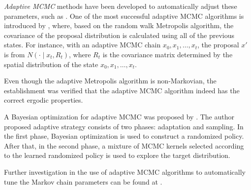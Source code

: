 
\textit{Adaptive MCMC} methods have been developed to automatically adjust these parameters, such as \citep{andrieu2008tutorial, girolami2011riemann,  atchade2009adaptive, roberts2009examples}. One of the most successful adaptive MCMC algorithms is introduced by \cite{haario2001adaptive}, where, based on the  random walk Metropolis algorithm, the covariance of the proposal distribution is calculated using all of the previous states. For instance, with an adaptive MCMC chain $x_0,x_1,\ldots,x_t$, the proposal $x'$ is from $N(\cdot\mid x_t,R_t)$, where $R_t$ is the covariance matrix determined by the spatial distribution of the state $x_0,x_1,\ldots,x_t$. 

Even though the adaptive Metropolis algorithm is non-Markovian, the establishment was verified that the adaptive MCMC algorithm indeed has the correct ergodic properties. 

A Bayesian optimization for adaptive MCMC was proposed by \cite{mahendran2012adaptive}. The author proposed adaptive strategy consists of two phases: adaptation and sampling. In the first phase, Bayesian optimization is used to construct a randomized policy. After that, in the second phase,  a mixture of MCMC kernels selected according to the learned randomized policy is used to explore the target distribution. 

Further investigation in the use of adaptive MCMC algorithms to automatically
tune the Markov chain parameters can be found at \citep{roberts2009examples}. 



